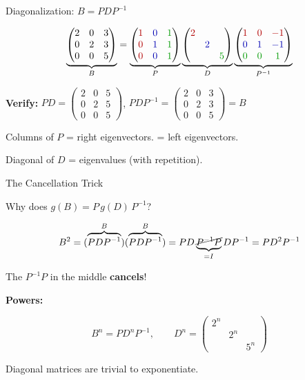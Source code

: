 \documentclass[10pt]{beamer}
\theoremstyle{definition}
\newcommand{\x}[1]{\alert{\textbf{#1}}}
\newcommand{\rd}[1]{{\color{red!70!black}#1}}
\newcommand{\bl}[1]{{\color{blue!70!black}#1}}
\newcommand{\gn}[1]{{\color{green!60!black}#1}}
\begin{document}
\begin{frame}[shrink=5]{Diagonalization: $B = PDP^{-1}$}

$$\underbrace{\begin{pmatrix}2&0&3\\0&2&3\\0&0&5\end{pmatrix}}_{B} = \underbrace{\begin{pmatrix}\rd{1}&\bl{0}&\gn{1}\\\rd{0}&\bl{1}&\gn{1}\\\rd{0}&\bl{0}&\gn{1}\end{pmatrix}}_{P} \underbrace{\begin{pmatrix}\rd{2}&&\\&\bl{2}&\\&&\gn{5}\end{pmatrix}}_{D} \underbrace{\begin{pmatrix}\rd{1}&\rd{0}&\rd{-1}\\\bl{0}&\bl{1}&\bl{-1}\\\gn{0}&\gn{0}&\gn{1}\end{pmatrix}}_{P^{-1}}$$

\vfill

\x{Verify:}
$PD = \begin{pmatrix}2&0&5\\0&2&5\\0&0&5\end{pmatrix}$, \quad
$PDP^{-1} = \begin{pmatrix}2&0&3\\0&2&3\\0&0&5\end{pmatrix} = B$ \;\checkmark

\vfill\pause

\rd{Columns of $P$} = right eigenvectors. \quad \rd{Rows of $P^{-1}$} = left eigenvectors.

\vfill

\rd{Diagonal of $D$} = eigenvalues (with repetition).

\end{frame}


\begin{frame}{The Cancellation Trick}

Why does $g(B) = P\,g(D)\,P^{-1}$?

\vfill

$$B^2 = (\overbrace{PDP^{-1}}^{B})(\overbrace{PDP^{-1}}^{B}) = PD\underbrace{\cancel{P^{-1}P}}_{= I}DP^{-1} = PD^2P^{-1}$$

\vfill

The $P^{-1}P$ in the middle \x{cancels}!

\vfill\pause

\x{Powers:}

$$B^n = P D^n P^{-1}, \qquad D^n = \begin{pmatrix}2^n&&\\&2^n&\\&&5^n\end{pmatrix}$$

\vfill

Diagonal matrices are trivial to exponentiate.

\end{frame}
\end{document}
